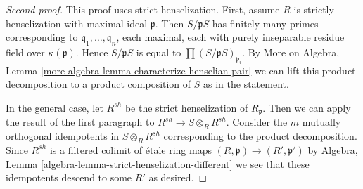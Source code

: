 \begin{proof}[Second proof]
This proof uses strict henselization. First, assume $R$ is strictly
henselization with maximal ideal $\mathfrak p$. Then $S/\mathfrak p S$
has finitely many primes corresponding to
$\mathfrak q_1, \ldots, \mathfrak q_n$, each maximal,
each with purely inseparable residue field over $\kappa(\mathfrak p)$.
Hence $S/\mathfrak p S$ is equal to $\prod (S/\mathfrak p S)_{\mathfrak p_i}$.
By More on Algebra, Lemma \ref{more-algebra-lemma-characterize-henselian-pair}
we can lift this product decomposition to a product composition of $S$
as in the statement.

\medskip\noindent
In the general case, let $R^{sh}$ be the strict henselization of
$R_\mathfrak p$. Then we can apply the result of the first paragraph
to $R^{sh} \to S \otimes_R R^{sh}$. Consider the $m$ mutually orthogonal
idempotents in $S \otimes_R R^{sh}$ corresponding to the product
decomposition. Since $R^{sh}$ is a filtered colimit of \'etale
ring maps $(R, \mathfrak p) \to (R', \mathfrak p')$ by
Algebra, Lemma \ref{algebra-lemma-strict-henselization-different}
we see that these idempotents descend to some $R'$ as desired.
\end{proof}